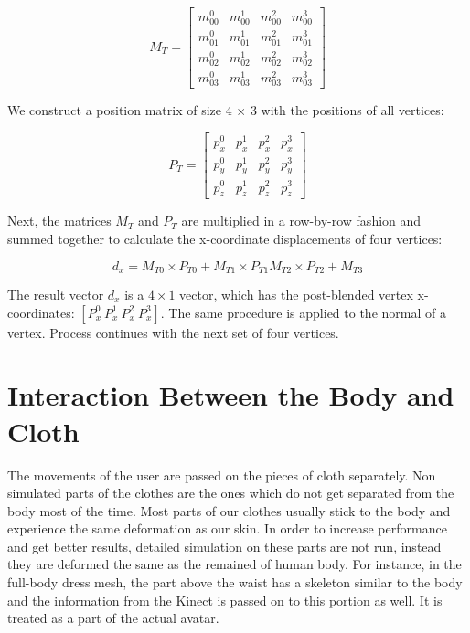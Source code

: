 \begin{equation}
M_T=
\begin{bmatrix}
m_{00}^0 & m_{00}^1 & m_{00}^2 & m_{00}^3 \\
m_{01}^0 & m_{01}^1 & m_{01}^2 & m_{01}^3 \\
m_{02}^0 & m_{02}^1 & m_{02}^2 & m_{02}^3 \\
m_{03}^0 & m_{03}^1 & m_{03}^2 & m_{03}^3 
\end{bmatrix}
\label{eqn:transposed_weight_matrix}
\end{equation}

We construct a position matrix of size 4 $\times$ 3 with the positions of all vertices:

\begin{equation}
P_T=
\begin{bmatrix}
p_{x}^0 & p_{x}^1 & p_{x}^2 & p_{x}^3 \\
p_{y}^0 & p_{y}^1 & p_{y}^2 & p_{y}^3 \\
p_{z}^0 & p_{z}^1 & p_{z}^2 & p_{z}^3  
\end{bmatrix}
\label{eqn:transposed_position_matrix}
\end{equation}

Next, the matrices $M_T$ and $P_T$ are multiplied in a row-by-row fashion and summed together to calculate the x-coordinate displacements
of four vertices:

\begin{equation}
d_x=M_{T0} \times P_{T0} + M_{T1} \times P_{T1} M_{T2} \times P_{T2} +M_{T3}
\label{eqn:collapsed_matrix}
\end{equation}

The result vector $d_x$ is a $4 \times 1$ vector, which has the post-blended vertex x-coordinates: $[P^0_x \: P^1_x  \: P^2_x  \: P^3_x]$. The same procedure is applied to the normal of a vertex. Process continues with the next set of four vertices. 

\section{Interaction Between the Body and Cloth}
\label{section_body_cloth_interaction}
The movements of the user are passed on the pieces of cloth separately. Non simulated parts of the clothes are the ones which do not get separated from the body most of the time. Most parts of our clothes usually stick to the body and experience the same deformation as our skin. In order to increase performance and get better results, detailed simulation on these parts are not run, instead they are deformed the same as the remained of human body. For instance, in the full-body dress mesh, the part above the waist has a skeleton similar to the body and the information from the Kinect is passed on to this portion as well. It is treated as a part of the actual avatar.

